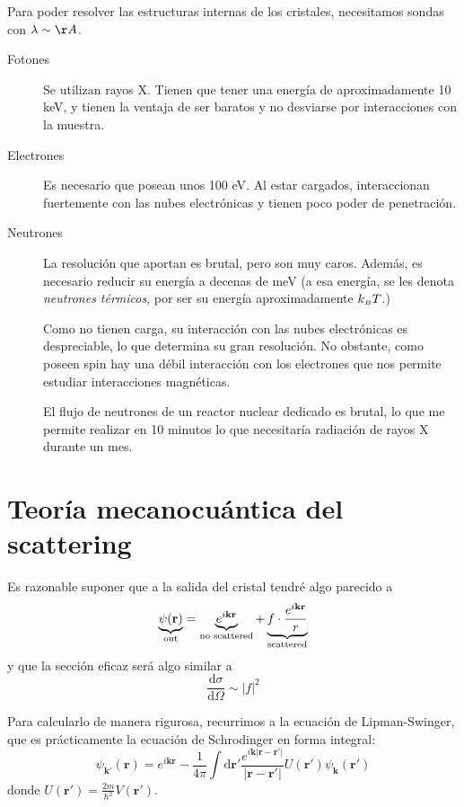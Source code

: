 Para poder resolver las estructuras internas de los cristales, necesitamos
sondas con $\lambda \sim \AA$.
\begin{description}
\item[Fotones] Se utilizan rayos X. Tienen que tener una energía de
  aproximadamente 10 keV, y tienen la ventaja de ser baratos y no desviarse por
  interacciones con la muestra.
\item[Electrones] Es necesario que posean unos 100 eV. Al estar cargados,
  interaccionan fuertemente con las nubes electrónicas y tienen poco poder de
  penetración.
\item[Neutrones] La resolución que aportan es brutal, pero son muy caros.
  Además, es necesario reducir su energía a decenas de meV (a esa energía, se
  les denota \emph{neutrones térmicos}, por ser su energía aproximadamente
  $k_{\scriptscriptstyle{B}} T$.)

  Como no tienen carga, su interacción con las nubes electrónicas es
  despreciable, lo que determina su gran resolución. No obstante, como poseen
  spin hay una débil interacción con los electrones que nos permite estudiar
  interacciones magnéticas.

  El flujo de neutrones de un reactor nuclear dedicado es brutal, lo que me
  permite realizar en 10 minutos lo que necesitaría radiación de rayos X durante
  un mes.
\end{description}

\section{Teoría mecanocuántica del scattering}
Es razonable suponer que a la salida del cristal tendré algo parecido a
\begin{equation}
  \underbrace{\psi(\mathbf{r})}_{\mathclap{\text{out}}} = \underbrace{e ^{i \mathbf{k}\mathbf{r}}}_{\text{no scattered}} + \underbrace{f\cdot \frac{e ^{i \mathbf{k}\mathbf{r}}}{r}}_{\text{scattered}}
\end{equation}
y que la sección eficaz será algo similar a
\begin{equation}
  \frac{\text{d}\sigma}{\text{d}\Omega} \sim \vert f \vert ^2
\end{equation}

Para calcularlo de manera rigurosa, recurrimos a la ecuación de Lipman-Swinger,
que es prácticamente la ecuación de Schrodinger en forma integral:
\begin{equation}
  \psi _{\mathbf{k'} } (\mathbf{r}) = e ^{i\mathbf{k}\mathbf{r}} - \frac{1}{4\pi} \int \text{d}\mathbf{r'}  \frac{e ^{i \mathbf{k}\vert \mathbf{r}-\mathbf{r}' \vert}}{\vert \mathbf{r}-\mathbf{r}' \vert} U(\mathbf{r}') \psi _{\mathbf{k}}(\mathbf{r'}) 
\end{equation}
donde $U(\mathbf{r}') = \frac{2m}{\hbar^2}V(\mathbf{r}')$.

